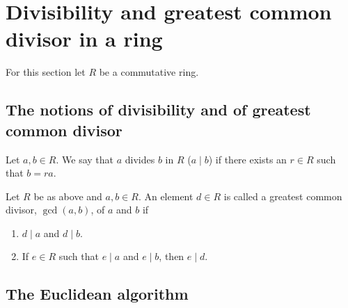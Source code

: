 \documentclass[10pt, a4paper]{article}
\begin{document}
\newpage

\section{Divisibility and greatest common divisor in a ring}
For this section let $R$ be a commutative ring.

\subsection{The notions of divisibility and of greatest common divisor}
\begin{definition}
    Let $a, b \in R$.
    We say that $a$ divides $b$ in $R$
    ($a \mid b$)
    if there exists an $r \in R$ such that $b = ra$.
\end{definition}

\begin{definition}\label{prep:algII:def:gcd}
    Let $R$ be as above and $a, b \in R$.
    An element $d \in R$ is called a greatest common divisor,
    $\gcd(a, b)$,
    of $a$ and $b$ if
    
    \begin{enumerate}[label = (\roman*)]
        \item $d \mid a$ and $d \mid b$.
        \item If $e \in R$ such that $e \mid a$ and $e \mid b$,
        then $e \mid d$.
    \end{enumerate}
\end{definition}


\subsection{The Euclidean algorithm}
\end{document}
